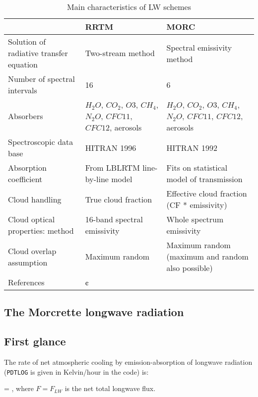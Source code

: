 \begin{table}[h]
 \caption{Main characteristics of LW schemes}
\begin{center}
   \begin{tabular}{p{5cm}|p{5cm}|p{5cm}} \label{radtable1}
          & RRTM & MORC   \\
    \hline
    \hline
    Solution of radiative transfer equation & Two-stream method & Spectral emissivity method \\
    \hline
    Number of spectral intervals & 16  & 6 \\
    \hline
    Absorbers & $H_{2}O$, $CO_{2}$, $O{3}$, $CH_{4}$, $N_{2}O$, $CFC11$, $CFC12$, aerosols & $H_{2}O$, $CO_{2}$, $O{3}$, $CH_{4}$, $N_{2}O$, $CFC11$, $CFC12$, aerosols \\            
    \hline
    Spectroscopic data base & HITRAN 1996 & HITRAN 1992 \\
    \hline
    Absorption coefficient & From LBLRTM line-by-line model & Fits on statistical model of transmission \\
    \hline
    Cloud handling & True cloud fraction & Effective cloud fraction (CF * emissivity) \\ 
    \hline
    Cloud optical properties: method & 16-band spectral emissivity & Whole spectrum emissivity \\
    \hline
    Cloud overlap assumption & Maximum random & Maximum random (maximum and random also possible) \\
    \hline
    References & ¢\citep{Mlawer1997} &  \citep{Morcrette1986,Morcrette1991,Gregory2000} \\ 
   \end{tabular}
\end{center}
\end{table}

\subsection{The Morcrette longwave radiation}
%
\subsection{First glance}
%

The rate of net atmospheric cooling by emission-absorption of longwave radiation
({\tt PDTLOG} is given in Kelvin/hour in the code) is:

\medskip
\be
{} =  ,
\label{ecmwf21}
\ee
\medskip
\noindent where $F=F_{LW}$ is the net total longwave flux.

